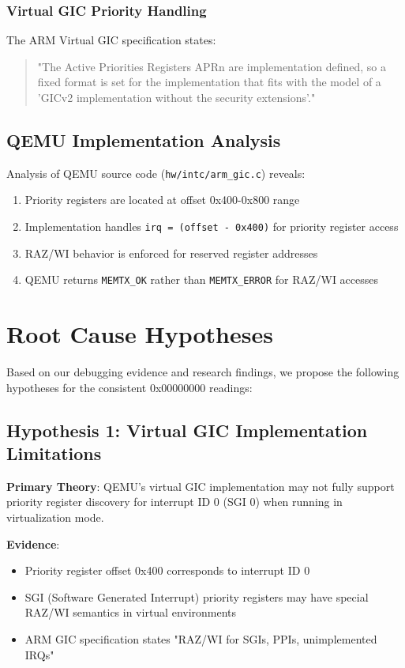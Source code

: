\documentclass[12pt,a4paper]{article}
\begin{document}
\subsubsection{Virtual GIC Priority Handling}
The ARM Virtual GIC specification states:
\begin{quote}
"The Active Priorities Registers APRn are implementation defined, so a fixed format is set for the implementation that fits with the model of a 'GICv2 implementation without the security extensions'."
\end{quote}

\subsection{QEMU Implementation Analysis}

Analysis of QEMU source code (\texttt{hw/intc/arm\_gic.c}) reveals:

\begin{enumerate}
    \item Priority registers are located at offset 0x400-0x800 range
    \item Implementation handles \texttt{irq = (offset - 0x400)} for priority register access
    \item RAZ/WI behavior is enforced for reserved register addresses
    \item QEMU returns \texttt{MEMTX\_OK} rather than \texttt{MEMTX\_ERROR} for RAZ/WI accesses
\end{enumerate}

\section{Root Cause Hypotheses}

Based on our debugging evidence and research findings, we propose the following hypotheses for the consistent 0x00000000 readings:

\subsection{Hypothesis 1: Virtual GIC Implementation Limitations}

\textbf{Primary Theory}: QEMU's virtual GIC implementation may not fully support priority register discovery for interrupt ID 0 (SGI 0) when running in virtualization mode.

\textbf{Evidence}:
\begin{itemize}
    \item Priority register offset 0x400 corresponds to interrupt ID 0
    \item SGI (Software Generated Interrupt) priority registers may have special RAZ/WI semantics in virtual environments
    \item ARM GIC specification states "RAZ/WI for SGIs, PPIs, unimplemented IRQs"
\end{itemize}
\end{document}

